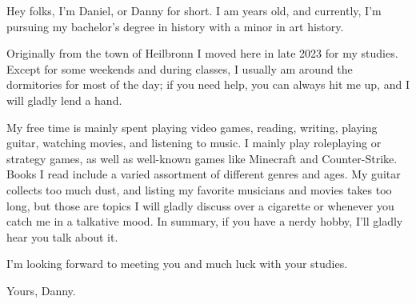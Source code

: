 Hey folks, I'm Daniel, or Danny for short. I am \myage{} years old, and currently, I'm pursuing my bachelor's degree in history with a minor in art history.

Originally from the town of Heilbronn I moved here in late 2023 for my studies. Except for some weekends and during classes, I usually am around the dormitories for most of the day; if you need help, you can always hit me up, and I will gladly lend a hand.

My free time is mainly spent playing video games, reading, writing, playing guitar, watching movies, and listening to music. I mainly play roleplaying or strategy games, as well as well-known games like Minecraft and Counter-Strike. Books I read include a varied assortment of different genres and ages. My guitar collects too much dust, and listing my favorite musicians and movies takes too long, but those are topics I will gladly discuss over a cigarette or whenever you catch me in a talkative mood. In summary, if you have a nerdy hobby, I'll gladly hear you talk about it.

I'm looking forward to meeting you and much luck with your studies.

Yours, Danny.
